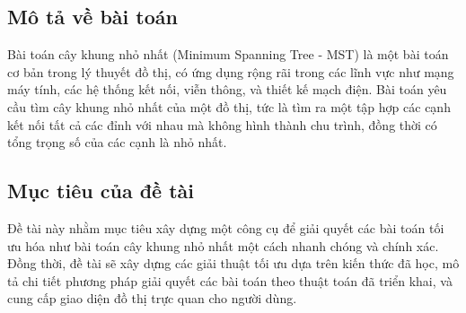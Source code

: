 {}
\setcounter{section}{1}

\subsection{Mô tả về bài toán}

Bài toán cây khung nhỏ nhất (Minimum Spanning Tree - MST) là một bài toán cơ bản trong lý thuyết đồ thị, có ứng dụng rộng rãi trong các lĩnh vực như mạng máy tính, các hệ thống kết nối, viễn thông, và thiết kế mạch điện. Bài toán yêu cầu tìm cây khung nhỏ nhất của một đồ thị, tức là tìm ra một tập hợp các cạnh kết nối tất cả các đỉnh với nhau mà không hình thành chu trình, đồng thời có tổng trọng số của các cạnh là nhỏ nhất.

\subsection{Mục tiêu của đề tài}
Đề tài này nhằm mục tiêu xây dựng một công cụ để giải quyết các bài toán tối ưu hóa như bài toán cây khung nhỏ nhất một cách nhanh chóng và chính xác. Đồng thời, đề tài sẽ xây dựng các giải thuật tối ưu dựa trên kiến thức đã học, mô tả chi tiết phương pháp giải quyết các bài toán theo thuật toán đã triển khai, và cung cấp giao diện đồ thị trực quan cho người dùng.

